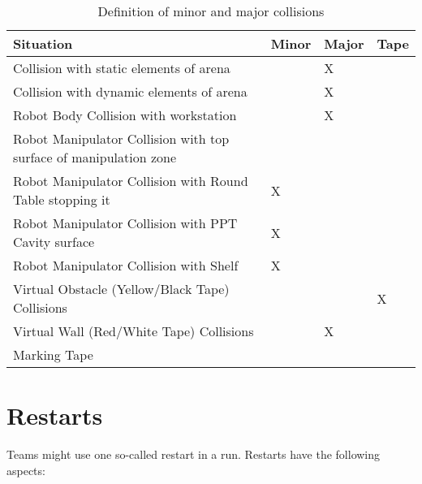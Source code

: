 \begin{table}[h!]
	\caption{Definition of minor and major collisions}
	\label{tab:collisions}
	\centering
  \begin{tabular}{|l|p{1cm}|p{1cm}|p{1.5cm}|}
		\hline
		Situation                                                & Minor & Major &  Tape \\
    \hline
    Collision with static elements of arena                  &       & X     &              \\
    Collision with dynamic elements of arena                 &       & X     &              \\
    Robot Body Collision with workstation                    &       & X     &              \\
    Robot Manipulator Collision with top surface of manipulation zone       &       &       &              \\
    Robot Manipulator Collision with Round Table stopping it & X     &       &              \\
    Robot Manipulator Collision with PPT Cavity surface      & X     &       &              \\
    Robot Manipulator Collision with Shelf                   & X     &       &              \\
	Virtual Obstacle (Yellow/Black Tape) Collisions                             &       &       & X            \\
    Virtual Wall (Red/White Tape) Collisions                                &       & X     &              \\
    Marking Tape & & & \\
    \hline
	\end{tabular}
\end{table}

\section{Restarts}
Teams might use one so-called restart in a run. Restarts have the following aspects:

